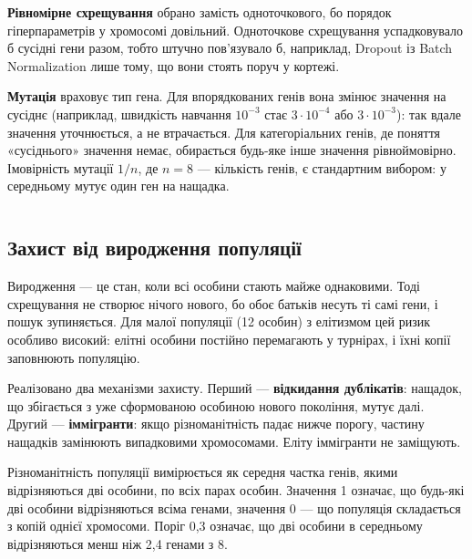 \documentclass[14pt,a4paper]{extreport}
\begin{document}
\textbf{Рівномірне схрещування} обрано замість одноточкового, бо порядок гіперпараметрів у хромосомі довільний. Одноточкове схрещування успадковувало б сусідні гени разом, тобто штучно пов'язувало б, наприклад, Dropout із Batch Normalization лише тому, що вони стоять поруч у кортежі.

\textbf{Мутація} враховує тип гена. Для впорядкованих генів вона змінює значення на сусіднє (наприклад, швидкість навчання $10^{-3}$ стає $3 \cdot 10^{-4}$ або $3 \cdot 10^{-3}$): так вдале значення уточнюється, а не втрачається. Для категоріальних генів, де поняття «сусіднього» значення немає, обирається будь-яке інше значення рівноймовірно. Імовірність мутації $1/n$, де $n = 8$ --- кількість генів, є стандартним вибором: у середньому мутує один ген на нащадка.

\inputminted[firstline=192,lastline=241]{python}{../src/aiit/evolution.py}
\label{lst:operators}

\subsection{Захист від виродження популяції}

Виродження --- це стан, коли всі особини стають майже однаковими. Тоді схрещування не створює нічого нового, бо обоє батьків несуть ті самі гени, і пошук зупиняється. Для малої популяції (12 особин) з елітизмом цей ризик особливо високий: елітні особини постійно перемагають у турнірах, і їхні копії заповнюють популяцію.

Реалізовано два механізми захисту. Перший --- \textbf{відкидання дублікатів}: нащадок, що збігається з уже сформованою особиною нового покоління, мутує далі. Другий --- \textbf{іммігранти}: якщо різноманітність падає нижче порогу, частину нащадків замінюють випадковими хромосомами. Еліту іммігранти не заміщують.

Різноманітність популяції вимірюється як середня частка генів, якими відрізняються дві особини, по всіх парах особин. Значення 1 означає, що будь-які дві особини відрізняються всіма генами, значення 0 --- що популяція складається з копій однієї хромосоми. Поріг 0,3 означає, що дві особини в середньому відрізняються менш ніж 2,4 генами з 8.
\end{document}

